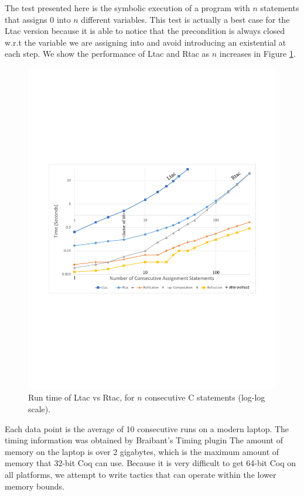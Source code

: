 \documentclass{puthesis}
\begin{document}
The test presented here is the symbolic execution of a program with
$n$ statements that assigns $0$ into $n$ different variables. This
test is actually a best case for the Ltac version because it is able
to notice that the precondition is always closed w.r.t the variable we
are assigning into and avoid introducing an existential at each
step. 
We show the performance of Ltac and
Rtac as $n$ increases in Figure \ref{fig:chart}.
\begin{figure}
\vspace{-2ex}
\includegraphics[width=\textwidth]{chart.pdf}
\vspace{-4ex}
\caption{Run time of Ltac vs Rtac, for $n$ consecutive C statements (log-log scale).}
\label{fig:chart}
\vspace{-4ex}
\end{figure}

Each data point is the average of 10 consecutive runs on a modern
laptop.  The timing information was obtained by Braibant's Timing
plugin \cite{braibant:timing} The amount of memory on the laptop is
over 2 gigabytes, which is the maximum amount of memory that 32-bit
Coq can use. Because it is very difficult to get 64-bit Coq on all
platforms, we attempt to write tactics that can operate within the
lower memory bounds.
\end{document}
